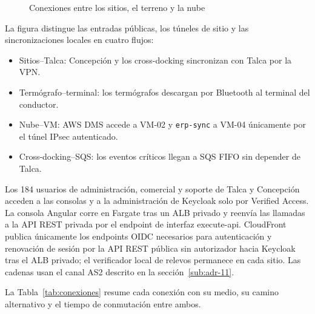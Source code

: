 \begin{figure}[htbp]
  \caption{Conexiones entre los sitios, el terreno y la nube}
  \label{fig:conexiones}
  \fuentefigura
\end{figure}

La figura distingue las entradas públicas, los túneles de sitio y las sincronizaciones locales en cuatro flujos:

\begin{itemize}
  \item Sitios--Talca: Concepción y los cross-docking sincronizan con Talca por la VPN.
  \item Termógrafo--terminal: los termógrafos descargan por Bluetooth al terminal del conductor.
  \item Nube--VM: AWS DMS accede a VM-02 y \texttt{erp-sync} a VM-04 únicamente por el túnel IPsec autenticado.
  \item Cross-docking--SQS: los eventos críticos llegan a SQS FIFO sin depender de Talca.
\end{itemize}

Los 184 usuarios de administración, comercial y soporte de Talca y Concepción acceden a las consolas y a la administración de Keycloak solo por Verified Access. La consola Angular corre en Fargate tras un ALB privado y reenvía las llamadas a la API REST privada por el endpoint de interfaz execute-api. CloudFront publica únicamente los endpoints OIDC necesarios para autenticación y renovación de sesión por la API REST pública sin autorizador hacia Keycloak tras el ALB privado; el verificador local de relevos permanece en cada sitio. Las cadenas usan el canal AS2 descrito en la sección~\ref{sub:adr-11}.

La Tabla~\ref{tab:conexiones} resume cada conexión con su medio, su camino alternativo y el tiempo de conmutación entre ambos.

